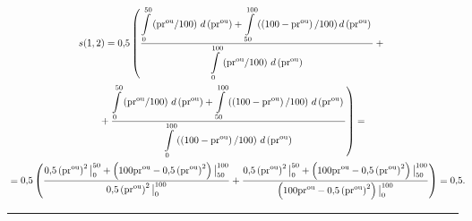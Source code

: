 \noindent
\begin{multline*}
s(1,2) = 0{,}5\left ( \displaystyle\frac{\displaystyle \int\limits_0^{50} \left(\mathrm{pr}^{\mathrm{ou}}/100\right)\,
d\left(\mathrm{pr}^{\mathrm{ou}}\right)+\int\limits_{50}^{100} 
\left((100-\mathrm{pr}^{\mathrm{ou}}\right)/100)\,d\left(\mathrm{pr}^{\mathrm{ou}}\right)\mathstrut}{\displaystyle \int\limits_{0}^{100}  
\left(\mathrm{pr}^{\mathrm{ou}}/100\right)\,d\left(\mathrm{pr}^{\mathrm{ou}}\right)\mathstrut}+{}\right.\\
\left.{}+\displaystyle\frac{\displaystyle \int\limits_0^{50} 
\left(\mathrm{pr}^{\mathrm{ou}}/100\right)\,d\left(\mathrm{pr}^{\mathrm{ou}}\right)+\int\limits_{50}^{100} \left(\left(100-
\mathrm{pr}^{\mathrm{ou}}\right)/100\right)\,d\left(\mathrm{pr}^{\mathrm{ou}}\right)\mathstrut}{\displaystyle \int\limits_0^{100} 
\left(\left(100-\mathrm{pr}^{\mathrm{ou}}\right)/100\right)\,d\left(\mathrm{pr}^{\mathrm{ou}}\right)\mathstrut}\right )={}\\
{}=
0{,}5\left ( \displaystyle\frac{\displaystyle 0{,}5\left(\mathrm{pr}^{\mathrm{ou}}\right)^2\big\vert_0^{50} +\left(100 \mathrm{pr}^{\mathrm{ou}}-
0{,}5\left(\mathrm{pr}^{\mathrm{ou}}\right)^2\right)\big\vert_{50}^{100}\mathstrut}{\displaystyle 0{,}5\left(\mathrm{pr}^{\mathrm{ou}}\right)^2\big\vert_0^{100}\mathstrut}+
\displaystyle\frac{\displaystyle 0{,}5\left(\mathrm{pr}^{\mathrm{ou}}\right)^2\big\vert_0^{50} +\left(100 \mathrm{pr}^{\mathrm{ou}}-
0{,}5\left(\mathrm{pr}^{\mathrm{ou}}\right)^2\right)\big\vert_{50}^{100}\mathstrut}{\displaystyle \left(100 \mathrm{pr}^{\mathrm{ou}} -
0{,}5\left(\mathrm{pr}^{\mathrm{ou}}\right)^2\right)\big\vert_0^{100}\mathstrut}\right ) = 0{,}5.\hspace*{-7.75pt}
\end{multline*}

\medskip

\hrule

\bigskip

